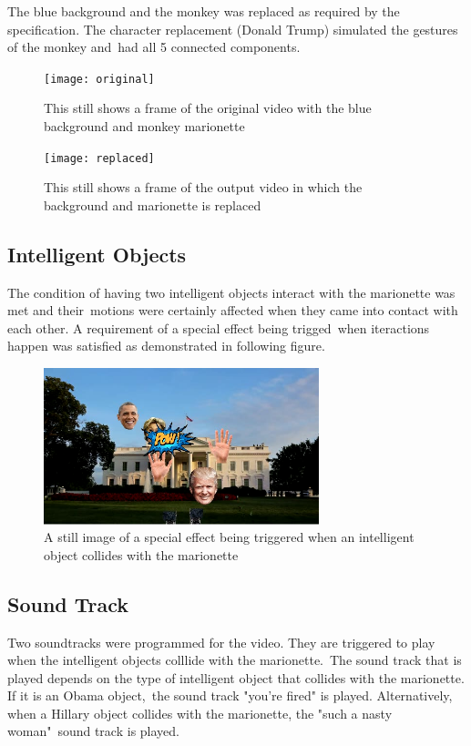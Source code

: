 \documentclass[12pt,a4paper]{article}
\begin{document}
      The blue background and the monkey was replaced as required by the specification. The character replacement (Donald Trump) simulated the gestures of the monkey and\
      had all 5 connected components.

      \begin{figure}[H]
        \texttt{[image: original]}
        \caption{This still shows a frame of the original video with the blue background and monkey marionette}
      \end{figure}
      \begin{figure}[H]
        \texttt{[image: replaced]}
        \caption{This still shows a frame of the output video in which the background and marionette is replaced}
      \end{figure}

      \subsection{Intelligent Objects}

      The condition of having two intelligent objects interact with the marionette was met and their\
      motions were certainly affected when they came into contact with each other. A requirement of a special effect being trigged\
      when iteractions happen was satisfied as demonstrated in following figure.

      \begin{figure}[H]
        \includegraphics[width=8cm]{pow}
        \caption{A still image of a special effect being triggered when an intelligent object collides with the marionette}
      \end{figure}

      \subsection{Sound Track}

      Two soundtracks were programmed for the video. They are triggered to play when the intelligent objects colllide with the marionette.\
      The sound track that is played depends on the type of intelligent object that collides with the marionette. If it is an Obama object,\
      the sound track "you're fired" is played. Alternatively, when a Hillary object collides with the marionette, the "such a nasty woman"\
      sound track is played.
\end{document}

